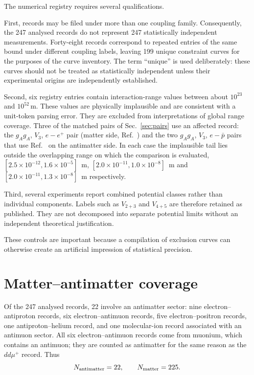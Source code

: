\documentclass[aps,prd,reprint,superscriptaddress,nofootinbib]{revtex4-2}
\begin{document}
	The numerical registry requires several qualifications.
	
	First, records may be filed under more than one coupling family.
	Consequently, the 247 analysed records do not represent 247 statistically independent measurements. Forty-eight records correspond to repeated entries of the same bound under different coupling labels, leaving 199 unique constraint curves for the purposes of the curve
	inventory. The term ``unique'' is used deliberately: these curves
	should not be treated as statistically independent unless their
	experimental origins are independently established.
	
	Second, six registry entries contain interaction-range values between about $10^{23}$ and $10^{52}\,\mathrm{m}$. These values are physically implausible and are
	consistent with a unit-token parsing error. They are excluded from interpretations of global range coverage.
Three of the matched pairs of Sec.~\ref{sec:pairs} use an affected
record: the $g_Ag_A$, $V_3$, $e-e^+$ pair (matter side,
Ref.~\cite{Ficek2017}) and the two $g_Ag_A$, $V_3$, $e-\bar p$ pairs that
use Ref.~\cite{Ficek2018} on the antimatter side. In each case the
implausible tail lies outside the overlapping range on which the
comparison is evaluated, $[2.5\times10^{-12},1.6\times10^{-5}]$~m,
$[2.0\times10^{-11},1.0\times10^{-8}]$~m and
$[2.0\times10^{-11},1.3\times10^{-8}]$~m respectively.
	
	Third, several experiments report combined potential classes rather
	than individual components. Labels such as $V_{2+3}$ and $V_{4+5}$ are
	therefore retained as published. They are not decomposed into separate
	potential limits without an independent theoretical justification.
	
	These controls are important because a compilation of exclusion curves
	can otherwise create an artificial impression of statistical precision.
	
	\section{Matter--antimatter coverage}
	
	Of the 247 analysed records, 22 involve an antimatter sector: nine
electron--antiproton records, six electron--antimuon records, five
electron--positron records, one antiproton--helium record, and one
molecular-ion record associated with an antimuon sector. All six
electron--antimuon records come from muonium, which contains an
antimuon; they are counted as antimatter for the same reason as the
$dd\mu^+$ record. Thus
	\begin{equation}
		N_{\rm antimatter}=22,
		\qquad
		N_{\rm matter}=225.
		\label{eq:mattercounts}
	\end{equation}
	
\end{document}
